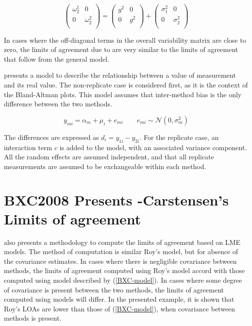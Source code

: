 \documentclass[12pt, a4paper]{report}
\theoremstyle{plain}
\theoremstyle{definition}
\theoremstyle{remark}
\begin{document}
\[\left(\begin{array}{cc}
\omega^1_2  & 0 \\
0 & \omega^2_2 \\
\end{array}  \right)
=  \left(
\begin{array}{cc}
g^2  & 0 \\
0 & g^2 \\
\end{array} \right)+
\left(
\begin{array}{cc}
\sigma^2_1  & 0 \\
0 & \sigma^2_2 \\
\end{array}\right)
\]

In cases where the off-diagonal terms in the overall variability
matrix are close to zero, the limits of agreement due to
\citet{bxc2008} are very similar to the limits of agreement that
follow from the general model.

\newpage

\citet{BXC2004} presents a model to describe the relationship between a value of measurement and its real value.
The non-replicate case is considered first, as it is the context of the Bland-Altman plots.
This model assumes that inter-method bias is the only difference between the two methods.


\begin{equation}
y_{mi}  = \alpha_{m} + \mu_{i} + e_{mi} \qquad  e_{mi} \sim \mathcal{N}(0,\sigma^{2}_{m})
\end{equation}

The differences are expressed as $d_{i} = y_{1i} - y_{2i}$.
For the replicate case, an interaction term $c$ is added to the model, with an associated variance component.
All the random effects are assumed independent, and that all replicate measurements are assumed to be exchangeable within each method.















	

\section{BXC2008 Presents -Carstensen's Limits of agreement}
\citet{BXC2008} also presents a methodology to compute the limits of agreement based on LME models. The method of computation is similar Roy's model, but for absence of the covariance estimates. In cases where there is negligible covariance between methods, the limits of agreement computed using Roy's model accord with those computed using model described by (\ref{BXC-model}). In cases where some degree of covariance is present between the two methods, the limits of agreement computed using models will differ. In the presented example, it is shown that Roy's LOAs are lower than those of (\ref{BXC-model}), when covariance between methods is present.
\end{document}
